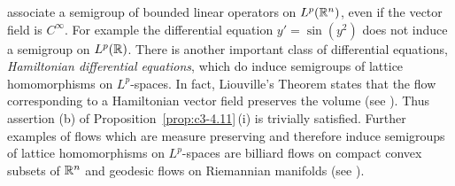 associate a semigroup of bounded linear operators on $L^p(\mathbb{R} ^n)$, even if
the vector field is $C^{\infty}$. For example the differential equation
$y' = \sin(y^2)$ does not induce a semigroup on $L^p(\mathbb{R} )$.
There is another important class of differential equations, \emph{Hamiltonian differential equations}, which do induce semigroups of lattice homomorphisms on $L^p$-spaces. In fact, Liouville's Theorem states that the flow corresponding to a Hamiltonian vector field preserves the volume (see \textcite[Section~3.3]{abraham:1978}). Thus assertion (b) of Proposition~\ref{prop:c3-4.11}\,(i) is trivially satisfied.
Further examples of flows which are measure preserving and therefore induce semigroups of lattice homomorphisms on $L^p$-spaces are billiard flows on compact convex subsets of\/ $\mathbb{R} ^n$ and geodesic flows on Riemannian manifolds (see \textcite{cornfeldetal:1982}).

